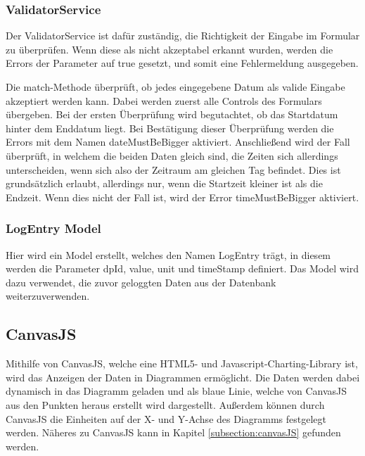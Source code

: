 \subsubsection{ValidatorService}
Der ValidatorService ist dafür zuständig, die Richtigkeit der Eingabe im Formular zu überprüfen. Wenn diese als nicht akzeptabel erkannt wurden, werden die Errors der Parameter auf true gesetzt, und somit eine Fehlermeldung ausgegeben.


Die match-Methode überprüft, ob jedes eingegebene Datum als valide Eingabe akzeptiert werden kann. Dabei werden zuerst alle Controls des Formulars übergeben. Bei der ersten Überprüfung wird begutachtet, ob das Startdatum hinter dem Enddatum liegt. Bei Bestätigung dieser Überprüfung werden die Errors mit dem Namen dateMustBeBigger aktiviert. Anschließend wird der Fall überprüft, in welchem die beiden Daten gleich sind, die Zeiten sich allerdings unterscheiden, wenn sich also der Zeitraum am gleichen Tag befindet. Dies ist grundsätzlich erlaubt, allerdings nur, wenn die Startzeit kleiner ist als die Endzeit. Wenn dies nicht der Fall ist, wird der Error timeMustBeBigger aktiviert.


\subsubsection{LogEntry Model}
Hier wird ein Model erstellt, welches den Namen LogEntry trägt, in diesem werden die Parameter dpId, value, unit und timeStamp definiert. Das Model wird dazu verwendet, die zuvor geloggten Daten aus der Datenbank weiterzuverwenden.


\subsection{CanvasJS}
Mithilfe von CanvasJS, welche eine HTML5- und Javascript-Charting-Library ist, wird das Anzeigen der Daten in Diagrammen ermöglicht. Die Daten werden dabei dynamisch in das Diagramm geladen und als blaue Linie, welche von CanvasJS aus den Punkten heraus erstellt wird dargestellt. Außerdem können durch CanvasJS die Einheiten auf der X- und Y-Achse des Diagramms festgelegt werden. Näheres zu CanvasJS kann in Kapitel \ref{subsection:canvasJS} gefunden werden.


